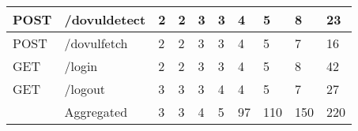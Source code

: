 \begin{table*}[]
\begin{tabular}{|l|l|l|l|l|l|l|l|l|l|}
POST                                  & /dovuldetect                       & 2                                          & 2                                          & 3                                          & 3                                          & 4                                          & 5                                          & 8                                          & 23                                          \\ \hline
POST                                  & /dovulfetch                        & 2                                          & 2                                          & 3                                          & 3                                          & 4                                          & 5                                          & 7                                          & 16                                          \\ \hline
GET                                   & /login                             & 2                                          & 2                                          & 3                                          & 3                                          & 4                                          & 5                                          & 8                                          & 42                                          \\ \hline
GET                                   & /logout                            & 3                                          & 3                                          & 3                                          & 4                                          & 4                                          & 5                                          & 7                                          & 27                                          \\ \hline
                                      & Aggregated                         & 3                                          & 3                                          & 4                                          & 5                                          & 97                                         & 110                                        & 150                                        & 220                                         \\ \hline
\end{tabular}
  \end{table*}
